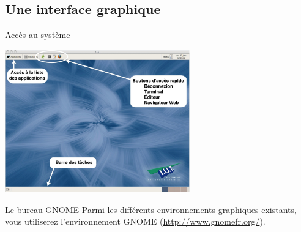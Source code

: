 \subsection{Une interface graphique}
\begin{frame}{Accès au système}
  \begin{center}
    \includegraphics[width=8cm]{img/s01/Gnome_desktop.jpg}
  \end{center}
  \begin{block}{Le bureau GNOME}
    Parmi les différents environnements graphiques existants, vous utiliserez l'environnement GNOME (\url{http://www.gnomefr.org/}).
  \end{block}
\end{frame}
